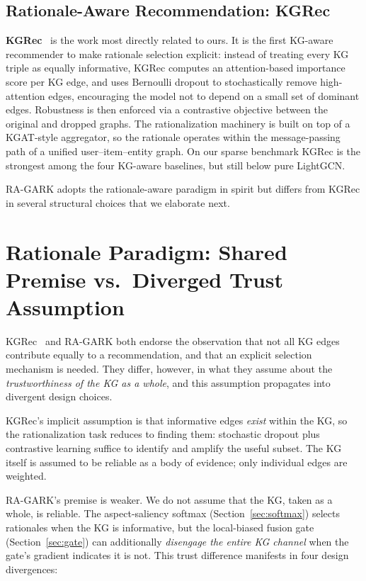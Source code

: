 \subsection{Rationale-Aware Recommendation: KGRec}
\label{sec:rw-kgrec}

\textbf{KGRec}~\cite{yang2023kgrec} is the work most directly related to ours. It is the first KG-aware recommender to make rationale selection explicit: instead of treating every KG triple as equally informative, KGRec computes an attention-based importance score per KG edge, and uses Bernoulli dropout to stochastically remove high-attention edges, encouraging the model not to depend on a small set of dominant edges. Robustness is then enforced via a contrastive objective between the original and dropped graphs. The rationalization machinery is built on top of a KGAT-style aggregator, so the rationale operates within the message-passing path of a unified user--item--entity graph. On our sparse benchmark KGRec is the strongest among the four KG-aware baselines, but still below pure LightGCN.

RA-GARK adopts the rationale-aware paradigm in spirit but differs from KGRec in several structural choices that we elaborate next.

\section{Rationale Paradigm: Shared Premise vs.\ Diverged Trust Assumption}
\label{sec:rw-paradigm}

KGRec~\cite{yang2023kgrec} and RA-GARK both endorse the observation that not all KG edges contribute equally to a recommendation, and that an explicit selection mechanism is needed. They differ, however, in what they assume about the \emph{trustworthiness of the KG as a whole}, and this assumption propagates into divergent design choices.

KGRec's implicit assumption is that informative edges \emph{exist} within the KG, so the rationalization task reduces to finding them: stochastic dropout plus contrastive learning suffice to identify and amplify the useful subset. The KG itself is assumed to be reliable as a body of evidence; only individual edges are weighted.

RA-GARK's premise is weaker. We do not assume that the KG, taken as a whole, is reliable. The aspect-saliency softmax (Section~\ref{sec:softmax}) selects rationales when the KG is informative, but the local-biased fusion gate (Section~\ref{sec:gate}) can additionally \emph{disengage the entire KG channel} when the gate's gradient indicates it is not. This trust difference manifests in four design divergences:


